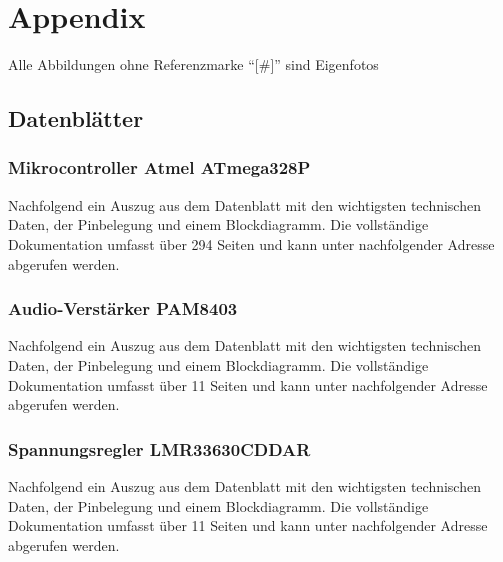\documentclass[a4paper, twoside, 12pt, openright]{memoir}
\newcommand{\AndreasGrain}{Andreas Grain}
\newcommand{\MatthiasMair}{Matthias Mair}
\newcommand{\authorName}{\AndreasGrain\ / \MatthiasMair}
\begin{document}
\renewcommand{\authorName}{\AndreasGrain\ / \MatthiasMair}
\appendix
\part{Appendix}
\printbibliography[title={Literatur und Quellen}]\clearpage
\printacronyms[heading=chapter,name=Abkürzungen]\clearpage
\listoffigures
Alle Abbildungen ohne Referenzmarke \enquote{[\#]} sind Eigenfotos\clearpage
\listoftables\clearpage

\chapter{Datenblätter}
\section{Mikrocontroller Atmel ATmega328P}
Nachfolgend ein Auszug aus dem Datenblatt mit den wichtigsten technischen Daten, der Pinbelegung und einem Blockdiagramm. Die vollständige Dokumentation umfasst über 294 Seiten und kann unter nachfolgender Adresse abgerufen werden.\par
{}
\section{Audio-Verstärker PAM8403}
Nachfolgend ein Auszug aus dem Datenblatt mit den wichtigsten technischen Daten, der Pinbelegung und einem Blockdiagramm. Die vollständige Dokumentation umfasst über 11 Seiten und kann unter nachfolgender Adresse abgerufen werden.\par
{}

\section{Spannungsregler LMR33630CDDAR}
Nachfolgend ein Auszug aus dem Datenblatt mit den wichtigsten technischen Daten, der Pinbelegung und einem Blockdiagramm. Die vollständige Dokumentation umfasst über 11 Seiten und kann unter nachfolgender Adresse abgerufen werden.\par
{}

\end{document}
